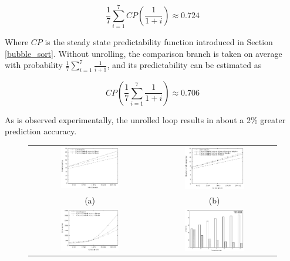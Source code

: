 \documentclass[acmtocl]{acmtrans2m}
\begin{document}
\[
\frac{1}{7}\sum^7_{i=1}CP\left(\frac{1}{1 + i}\right) \approx 0.724
\]

\noindent Where $CP$ is the steady state predictability function introduced in
Section \ref{bubble_sort}.  Without unrolling, the comparison branch is taken on
average with probability $\frac{1}{7}\sum^7_{i=1}\frac{1}{i + 1}$, and its
predictability can be estimated as

\[
CP\left(\frac{1}{7}\sum^7_{i=1}\frac{1}{1 + i} \right) \approx 0.706
\]

\noindent As is observed experimentally, the unrolled loop results in about a
2\% greater prediction accuracy.

\begin{figure}
\centering
\begin{tabular}{cc}
\includegraphics[width=0.5\textwidth]{plots/heapsort_branch_counts.eps} & \includegraphics[width=0.5\textwidth]{plots/heapsort_branch_misses.eps}\\
(a) & (b) \\
\includegraphics[width=0.5\textwidth]{plots/heapsort_cycle_counts.eps} & \includegraphics[width=0.5\textwidth]{plots/heapsort_8heap_branches.eps} \\

\end{tabular}
\end{figure}
\end{document}
